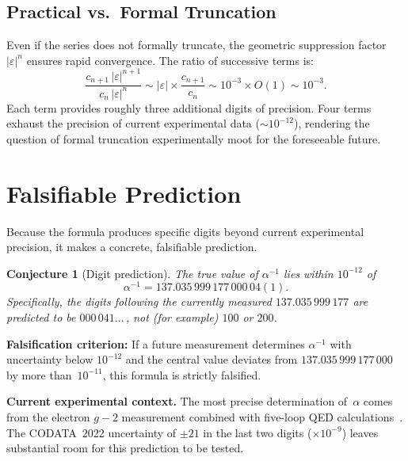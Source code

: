 \documentclass[11pt,twoside]{article}
\newtheorem{conjecture}{Conjecture}
\theoremstyle{remark}
\newcommand{\eps}{\varepsilon}
\newcommand{\inv}{\alpha^{-1}}
\begin{document}
\subsection{Practical vs.\ Formal Truncation}
\label{sec:practical}

Even if the series does not formally truncate, the geometric suppression factor~$|\eps|^n$ ensures rapid convergence.
The ratio of successive terms is:
\begin{equation}
    \frac{c_{n+1}\,|\eps|^{n+1}}{c_n\,|\eps|^n} \sim |\eps| \times \frac{c_{n+1}}{c_n} \sim 10^{-3} \times O(1) \sim 10^{-3}.
\end{equation}
Each term provides roughly three additional digits of precision.
Four terms exhaust the precision of current experimental data ($\sim 10^{-12}$), rendering the question of formal truncation experimentally moot for the foreseeable future.


\section{Falsifiable Prediction}
\label{sec:prediction}

Because the formula produces specific digits beyond current experimental precision, it makes a concrete, falsifiable prediction.

\begin{conjecture}[Digit prediction]
\label{conj:digits}
The true value of $\inv$ lies within $10^{-12}$ of
\begin{equation}
    \inv = 137.035\,999\,177\,000\,04(1).
\end{equation}
Specifically, the digits following the currently measured $137.035\,999\,177$ are predicted to be $000\,041...\,$, not (for example) $100$ or $200$.
\end{conjecture}

\noindent\textbf{Falsification criterion:}
If a future measurement determines $\inv$ with uncertainty below $10^{-12}$ and the central value deviates from $137.035\,999\,177\,000$ by more than~$10^{-11}$, this formula is strictly falsified.

\noindent\textbf{Current experimental context.}
The most precise determination of~$\alpha$ comes from the electron $g-2$ measurement combined with five-loop QED calculations~\cite{Morel2020, Aoyama2018}.
The CODATA~2022 uncertainty of $\pm 21$ in the last two digits ($\times 10^{-9}$) leaves substantial room for this prediction to be tested.
\end{document}
